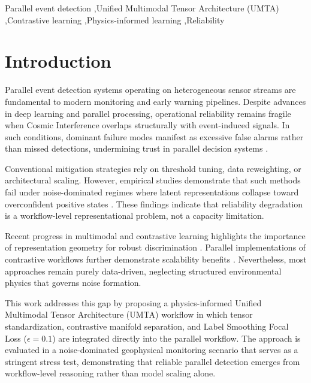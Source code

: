 \documentclass[a4paper,fleqn]{cas-sc}
\begin{document}
\begin{keywords}
Parallel event detection \sep Unified Multimodal Tensor Architecture (UMTA) \sep Contrastive learning \sep Physics-informed learning \sep Reliability
\end{keywords}

\maketitle

\section{Introduction}
Parallel event detection systems operating on heterogeneous sensor streams are fundamental to modern monitoring and early warning pipelines. Despite advances in deep learning and parallel processing, operational reliability remains fragile when Cosmic Interference  overlaps structurally with event-induced signals. In such conditions, dominant failure modes manifest as excessive false alarms rather than missed detections, undermining trust in parallel decision systems \citep{Ganguly2024JPDC,Strem2025RESS}.

Conventional mitigation strategies rely on threshold tuning, data reweighting, or architectural scaling. However, empirical studies demonstrate that such methods fail under noise-dominated regimes where latent representations collapse toward overconfident positive states \citep{Strem2025RESS}. These findings indicate that reliability degradation is a workflow-level representational problem, not a capacity limitation.

Recent progress in multimodal and contrastive learning highlights the importance of representation geometry for robust discrimination \citep{Ganguly2024JPDC}. Parallel implementations of contrastive workflows further demonstrate scalability benefits \citep{Mahmud2025}. Nevertheless, most approaches remain purely data-driven, neglecting structured environmental physics that governs noise formation.

This work addresses this gap by proposing a physics-informed Unified Multimodal Tensor Architecture (UMTA) workflow in which tensor standardization, contrastive manifold separation, and Label Smoothing Focal Loss ($\epsilon=0.1$)  are integrated directly into the parallel workflow. The approach is evaluated in a noise-dominated geophysical monitoring scenario that serves as a stringent stress test, demonstrating that reliable parallel detection emerges from workflow-level reasoning rather than model scaling alone.
\end{document}
